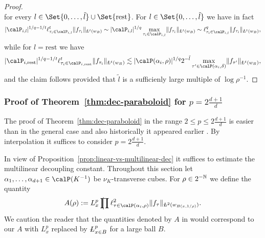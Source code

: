 \begin{proof}
\[\]
for every $l \in \Set{0,\dotsc,\tilde{l}} \cup \Set{\mathrm{rest}}$.
For $l \in \Set{0,\dotsc,\tilde{l}}$ we have in fact
\[
\abs{\calP_{i,l}}^{1/q-1/t}
\ell^{t}_{\tau_i \in \calP_{i,l}} \norm{f_{\tau_i}}_{\avL^{t}(w_B)}
\sim
\abs{\calP_{i,l}}^{1/q} \max_{\tau_i \in \calP_{i,l}} \norm{f_{\tau_i}}_{\avL^{t}(w_B)}
\sim
\ell^{q}_{\tau_i \in \calP_{i,l}} \norm{f_{\tau_i}}_{\avL^{t}(w_B)},
\]
while for $l=\mathrm{rest}$ we have
\[
\abs{\calP_{i,\mathrm{rest}}}^{1/q-1/t}
\ell^{t}_{\tau_i \in \calP_{i,\mathrm{rest}}} \norm{f_{\tau_i}}_{\avL^{t}(w_B)}
\lesssim
\abs{\Part[\alpha_{i}]{\rho}}^{1/q} 2^{-\tilde{l}}
\max_{\tau' \in \Part[\alpha_{i}]{\delta}} \norm{f_{\tau'}}_{\avL^{t}(w_B)},
\]
and the claim follows provided that $\tilde{l}$ is a sufficienly large multiple of $\log \rho^{-1}$.
\end{proof}

\subsubsection{Proof of Theorem~\ref{thm:dec-paraboloid} for $p=2\frac{d+1}{d}$}
The proof of Theorem~\ref{thm:dec-paraboloid} in the range $2 \leq p \leq 2\frac{d+1}{d}$ is easier than in the general case and also historically it appeared earlier \cite{MR3038558}.
By interpolation it suffices to consider $p=2\frac{d+1}{d}$.

In view of Proposition~\ref{prop:linear-vs-multilinear-dec} it suffices to estimate the multilinear decoupling constant.
Throughout this section let $\alpha_1,\dotsc,\alpha_{d+1} \in \Part{K^{-1}}$ be $\nu_{K}$-transverse cubes.
For $\rho \in 2^{-\mathbb{N}}$ we define the quantity
\begin{equation}\label{eq:Bourgain-Demeter-A}
A(\rho)
:=
L^{p}_{x} \avprod \ell^{2}_{\tau\in \Part[\alpha_i]{\rho}} \norm{f_{\tau}}_{\avL^{2}(w_{B(x,1/\rho)})}.
\end{equation}
We caution the reader that the quantities denoted by $A$ in \cite{MR3592159} would correspond to our $A$ with $L^{p}_{x}$ replaced by $\avL^{p}_{x\in B}$ for a large ball $B$.

